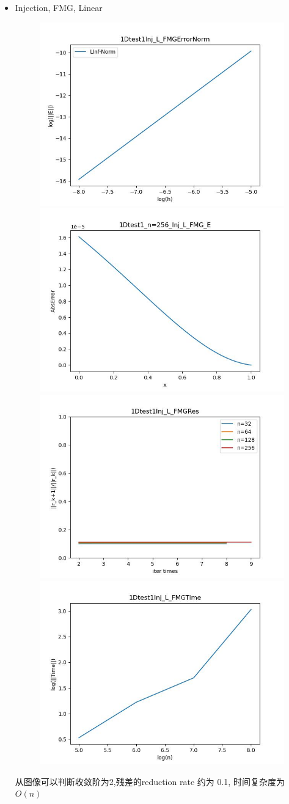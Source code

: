 \documentclass{article}
\begin{document}
\begin{itemize}
    \item Injection, FMG, Linear
    \begin{figure}[h]
        \centering
        \includegraphics[width=0.35\linewidth]{1Dtest1Inj_L_FMGErrorNorm.jpg}
        \includegraphics[width=0.35\linewidth]{1Dtest1_n=256_Inj_L_FMG_E.jpg}
        \includegraphics[width=0.35\linewidth]{1Dtest1Inj_L_FMGRes.jpg}
        \includegraphics[width=0.35\linewidth]{1Dtest1Inj_L_FMGTime.jpg}
    \end{figure}
    
    从图像可以判断收敛阶为2,残差的reduction rate 约为 0.1, 时间复杂度为$O(n)$
    \newpage


\end{itemize}
\end{document}
